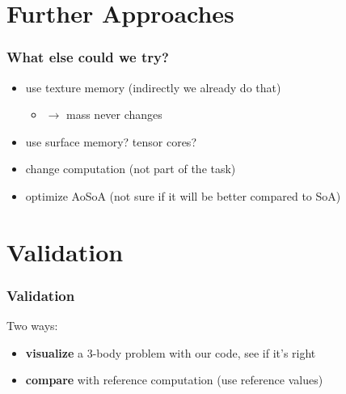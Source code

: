 \documentclass[aspectratio=169]{beamer}
\begin{document}


\section{Further Approaches}
\begin{frame}
	\frametitle{What else could we try?}
	\begin{itemize}
		\item use texture memory (indirectly we already do that)
		\begin{itemize}
			\item \(\rightarrow\) mass never changes
		\end{itemize}
		\item use surface memory? tensor cores?
		\item change computation (not part of the task)
		\item optimize AoSoA (not sure if it will be better compared to SoA)
	\end{itemize}
\end{frame}

\section{Validation}
\begin{frame}
	\frametitle{Validation}
	Two ways:
	\begin{itemize}
		\item  \textbf{visualize} a 3-body problem with our code, see if it's right
		\item  \textbf{compare} with reference computation (use reference values)
	\end{itemize}
\end{frame}
\end{document}
